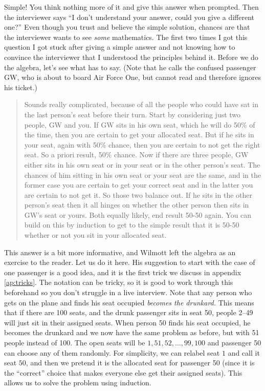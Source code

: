 \documentclass[a4paper]{article}
\begin{document}
Simple! You think nothing more of it and give this answer when prompted. Then the interviewer says ``I don't understand your answer, could you give a different one?''
Even though you trust and believe the simple solution, chances are that the interviewer wants to see \emph{some} mathematics.
The first two times I got this question I got stuck after giving a simple answer and not knowing how to convince the interviewer that I understood the principles behind it.
Before we do the algebra, let's see what \citet{WilmottFAQ} has to say. (Note that he calls the confused passenger GW, who is about to board Air Force One, but cannot read and therefore ignores his ticket.)
\begin{quote}
Sounds really complicated, because of all the people
who could have sat in the last person’s seat before
their turn. Start by considering just two people, GW and
you. If GW sits in his own seat, which he will do 50\%
of the time, then you are certain to get your allocated
seat. But if he sits in your seat, again with 50\% chance,
then you are certain to not get the right seat. So a priori
result, 50\% chance. Now if there are three people, GW
either sits in his own seat or in your seat or in the
other person’s seat. The chances of him sitting in his
own seat or your seat are the same, and in the former
case you are certain to get your correct seat and in
the latter you are certain to not get it. So those two
balance out. If he sits in the other person’s seat then
it all hinges on whether the other person then sits in
GW’s seat or yours. Both equally likely, end result 50-50
again. You can build on this by induction to get to the
simple result that it is 50-50 whether or not you sit in
your allocated seat.
\end{quote}
This answer is a bit more informative, and Wilmott left the algebra as an exercise to the reader.
Let us do it here.
His suggestion to start with the case of one passenger is a good idea, and it is the first trick we discuss in appendix \ref{ap:tricks}.
The notation can be tricky, so it is good to work through this beforehand so you don't struggle in a live interview.
Note that any person who gets on the plane and finds his seat occupied \emph{becomes the drunkard.}
This means that if there are 100 seats, and the drunk passenger sits in seat 50, people 2--49 will just sit in their assigned seats.
When person 50 finds his seat occupied, he becomes the drunkard and we now have the same problem as before, but with 51 people instead of 100. The open seats will be
$1, 51,52,\ldots,99,100$
and passenger 50 can choose any of them randomly. For simplicity, we can relabel seat $1$ and call it seat $50$, and then we pretend it is the allocated seat for passenger 50 (since it is the ``correct'' choice that makes everyone else get their assigned seats).
This allows us to solve the problem using induction.
\end{document}
